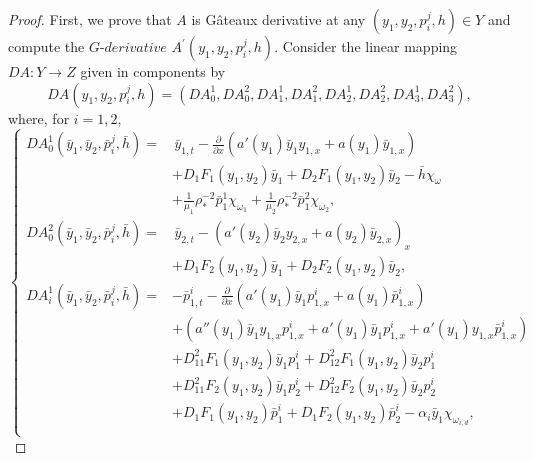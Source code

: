 \documentclass[10pt,a4paper]{amsart}
\begin{document}
\begin{proof}
    First, we prove that $A$ is Gâteaux derivative at any $(y_1,y_2,p_i^j,h) \in Y$ and compute the
    $\textit{G-derivative}$ $A^{\prime}(y_1,y_2,p_i^j,h)$.
    Consider the linear mapping $D A: Y \to Z$ given in components by
    $$
        D A(y_1,y_2,p_i^j,h) = (D A^1_0,D A^2_0, D A^1_1, D A^2_1, D A^1_2, D A^2_2, D A^1_3, D A^2_3),
    $$
    where, for $i=1,2$,
    \begin{equation*}
        \begin{cases}
		      D A^1_0(\bar y_1,\bar y_2,\bar p_i^j,\bar h) = &  \,
              \bar y_{1,t} - \frac{\partial}{\partial x}(a'(y_{1})\bar y_{1} y_{1,x} +a(y_1) \bar y_{1,x}) \\
            &+  D_1 F_1(y_1,y_2)\bar y_1 + D_2 F_1(y_1,y_2)\bar y_2 - \bar h \chi_{\omega} \\
            &+ \frac{1}{\mu_1} \rho_*^{-2} \bar p^1_1 \chi_{\omega_{1}} + \frac{1}{\mu_2} \rho_*^{-2} \bar p^2_1 \chi_{\omega_{2}}, \\
		      D A^2_0(\bar y_1,\bar y_2,\bar p_i^j,\bar h) =
            &  \, \bar y_{2,t} - (a'(y_{2})\bar y_{2}y_{2,x} + a(y_{2}) \bar y_{2,x})_x \\
            &+ D_1 F_2(y_1,y_2)\bar y_1 + D_2 F_2(y_1,y_2)\bar y_2, \\
            D A^1_i(\bar y_1,\bar y_2,\bar p_i^j,\bar h) =& - \bar p_{1,t}^i - \frac{\partial}{\partial x}\left(a'(y_{1})\bar y_{1} p^i_{1,x} + a(y_{1}) \bar p^i_{1,x}\right) \\
            &+ \left( a''(y_{1})\bar y_{1} y_{1,x} p^i_{1,x} + a'(y_{1})\bar y_{1}  p^i_{1,x} + a'(y_1)y_{1,x} \bar p^i_{1,x} \right) \\
            &+ D_{11}^2 F_1(y_1,y_2)\bar y_1 p^i_1 + D_{12}^2 F_1(y_1,y_2)\bar y_2 p^i_1 \\
            &+ D_{11}^2 F_2(y_1,y_2)\bar y_1 p^i_2 + D_{12}^2 F_2(y_1,y_2)\bar y_2 p^i_2 \\
            &+ D_1 F_1(y_1,y_2) \bar p^i_1 + D_1 F_2(y_1,y_2) \bar p^i_2 - \alpha_i \bar y_1 \chi_{\omega_{i,d}}, \\

\end{cases}
\end{equation*}
\end{proof}
\end{document}
